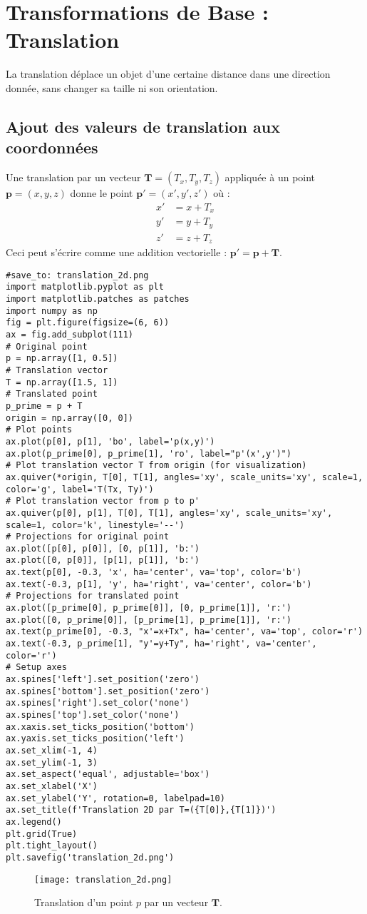 \section{Transformations de Base : Translation}
La translation déplace un objet d'une certaine distance dans une direction donnée, sans changer sa taille ni son orientation.
\subsection{Ajout des valeurs de translation aux coordonnées}
Une translation par un vecteur \( \mathbf{T} = (T_x, T_y, T_z) \) appliquée à un point \( \mathbf{p} = (x, y, z) \) donne le point \( \mathbf{p'} = (x', y', z') \) où :
\begin{align*} x' &= x + T_x \\ y' &= y + T_y \\ z' &= z + T_z \end{align*}
Ceci peut s'écrire comme une addition vectorielle : \( \mathbf{p'} = \mathbf{p} + \mathbf{T} \).
\begin{verbatim}
#save_to: translation_2d.png
import matplotlib.pyplot as plt
import matplotlib.patches as patches
import numpy as np
fig = plt.figure(figsize=(6, 6))
ax = fig.add_subplot(111)
# Original point
p = np.array([1, 0.5])
# Translation vector
T = np.array([1.5, 1])
# Translated point
p_prime = p + T
origin = np.array([0, 0])
# Plot points
ax.plot(p[0], p[1], 'bo', label='p(x,y)')
ax.plot(p_prime[0], p_prime[1], 'ro', label="p'(x',y')")
# Plot translation vector T from origin (for visualization)
ax.quiver(*origin, T[0], T[1], angles='xy', scale_units='xy', scale=1, color='g', label='T(Tx, Ty)')
# Plot translation vector from p to p'
ax.quiver(p[0], p[1], T[0], T[1], angles='xy', scale_units='xy', scale=1, color='k', linestyle='--')
# Projections for original point
ax.plot([p[0], p[0]], [0, p[1]], 'b:')
ax.plot([0, p[0]], [p[1], p[1]], 'b:')
ax.text(p[0], -0.3, 'x', ha='center', va='top', color='b')
ax.text(-0.3, p[1], 'y', ha='right', va='center', color='b')
# Projections for translated point
ax.plot([p_prime[0], p_prime[0]], [0, p_prime[1]], 'r:')
ax.plot([0, p_prime[0]], [p_prime[1], p_prime[1]], 'r:')
ax.text(p_prime[0], -0.3, "x'=x+Tx", ha='center', va='top', color='r')
ax.text(-0.3, p_prime[1], "y'=y+Ty", ha='right', va='center', color='r')
# Setup axes
ax.spines['left'].set_position('zero')
ax.spines['bottom'].set_position('zero')
ax.spines['right'].set_color('none')
ax.spines['top'].set_color('none')
ax.xaxis.set_ticks_position('bottom')
ax.yaxis.set_ticks_position('left')
ax.set_xlim(-1, 4)
ax.set_ylim(-1, 3)
ax.set_aspect('equal', adjustable='box')
ax.set_xlabel('X')
ax.set_ylabel('Y', rotation=0, labelpad=10)
ax.set_title(f'Translation 2D par T=({T[0]},{T[1]})')
ax.legend()
plt.grid(True)
plt.tight_layout()
plt.savefig('translation_2d.png')
\end{verbatim}
\begin{figure}[H]
\centering
\texttt{[image: translation\_2d.png]}
\caption{Translation d'un point \( p \) par un vecteur \( \mathbf{T} \).}
\label{fig:translation_2d}
\end{figure}
